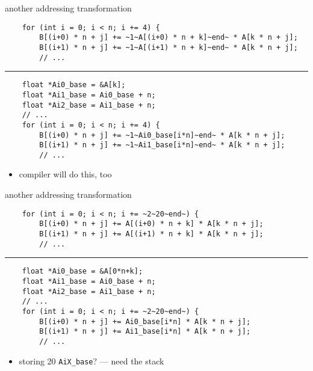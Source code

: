 \begin{frame}[fragile,label=addrXform2]{another addressing transformation}
    \vspace{-.25cm}
\begin{lstlisting}
    for (int i = 0; i < n; i += 4) {
        B[(i+0) * n + j] += ~1~A[(i+0) * n + k]~end~ * A[k * n + j];
        B[(i+1) * n + j] += ~1~A[(i+1) * n + k]~end~ * A[k * n + j];
        // ...
\end{lstlisting}
\hrule
\begin{lstlisting}
    float *Ai0_base = &A[k];
    float *Ai1_base = Ai0_base + n;
    float *Ai2_base = Ai1_base + n;
    // ...
    for (int i = 0; i < n; i += 4) {
        B[(i+0) * n + j] += ~1~Ai0_base[i*n]~end~ * A[k * n + j];
        B[(i+1) * n + j] += ~1~Ai1_base[i*n]~end~ * A[k * n + j];
        // ...
\end{lstlisting}
    \begin{itemize}
    \item compiler will do this, too
    \end{itemize}
\end{frame}

\begin{frame}[fragile,label=addrXform2Backfire]{another addressing transformation}
    \vspace{-.25cm}
\begin{lstlisting}
    for (int i = 0; i < n; i += ~2~20~end~) {
        B[(i+0) * n + j] += A[(i+0) * n + k] * A[k * n + j];
        B[(i+1) * n + j] += A[(i+1) * n + k] * A[k * n + j];
        // ...
\end{lstlisting}
\hrule
\begin{lstlisting}
    float *Ai0_base = &A[0*n+k];
    float *Ai1_base = Ai0_base + n;
    float *Ai2_base = Ai1_base + n;
    // ...
    for (int i = 0; i < n; i += ~2~20~end~) {
        B[(i+0) * n + j] += Ai0_base[i*n] * A[k * n + j];
        B[(i+1) * n + j] += Ai1_base[i*n] * A[k * n + j];
        // ...
\end{lstlisting}
    \begin{itemize}
    \item storing 20 \lstinline|AiX_base|? --- need the stack
    \end{itemize}
\end{frame}

